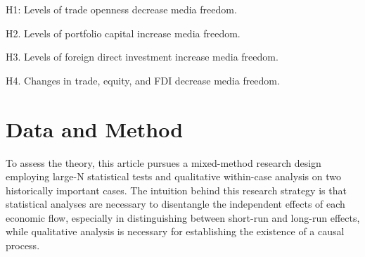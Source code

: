 \documentclass[12pt]{report}
\begin{document}
H1: Levels of trade openness decrease media freedom.

H2. Levels of portfolio capital increase media freedom.

H3. Levels of foreign direct investment increase media freedom.

H4. Changes in trade, equity, and FDI decrease media freedom.

\section{Data and Method}

To assess the theory, this article pursues a mixed-method research
design employing large-N statistical tests and qualitative within-case
analysis on two historically important cases. The intuition behind
this research strategy is that statistical analyses are necessary
to disentangle the independent effects of each economic flow, especially
in distinguishing between short-run and long-run effects, while qualitative
analysis is necessary for establishing the existence of a causal process.
\end{document}
